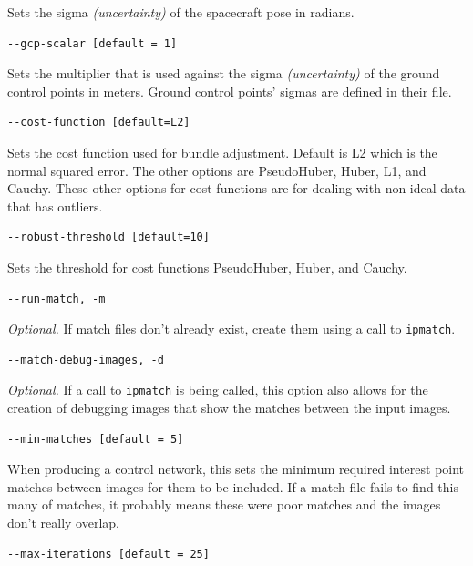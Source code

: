 Sets the sigma \emph{(uncertainty)} of the spacecraft pose in radians.

\begin{verbatim}
--gcp-scalar [default = 1]
\end{verbatim}

Sets the multiplier that is used against the sigma
\emph{(uncertainty)} of the ground control points in meters. Ground
control points' sigmas are defined in their file.

\begin{verbatim}
--cost-function [default=L2]
\end{verbatim}

Sets the cost function used for bundle adjustment. Default is L2 which
is the normal squared error. The other options are PseudoHuber, Huber,
L1, and Cauchy. These other options for cost functions are for dealing
with non-ideal data that has outliers.

\begin{verbatim}
--robust-threshold [default=10]
\end{verbatim}

Sets the threshold for cost functions PseudoHuber, Huber, and Cauchy.

\begin{verbatim}
--run-match, -m
\end{verbatim}

\emph{Optional.} If match files don't already exist, create them using a
call to \texttt{ipmatch}.

\begin{verbatim}
--match-debug-images, -d
\end{verbatim}

\emph{Optional.} If a call to \texttt{ipmatch} is being called, this option
also allows for the creation of debugging images that show the matches
between the input images.

\begin{verbatim}
--min-matches [default = 5]
\end{verbatim}

When producing a control network, this sets the minimum required
interest point matches between images for them to be included. If a
match file fails to find this many of matches, it probably means these
were poor matches and the images don't really overlap.

\begin{verbatim}
--max-iterations [default = 25]
\end{verbatim}


